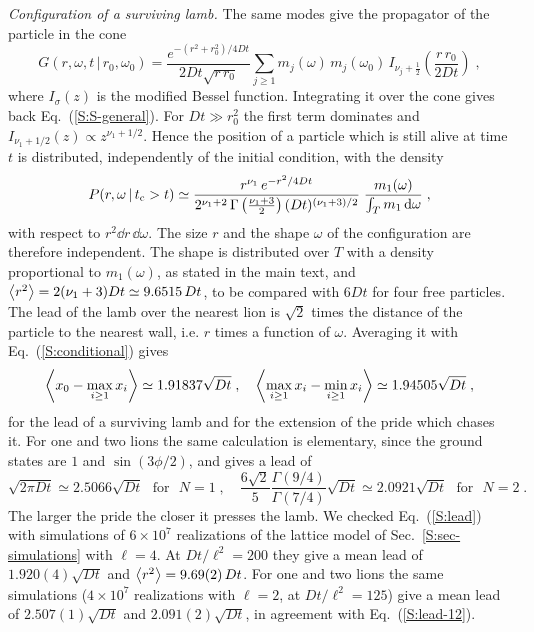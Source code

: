 \emph{Configuration of a surviving lamb.} The same modes give the propagator of the particle in the cone
\begin{equation} \label{S:propagator}
    G(r, \omega, t \,|\, r_0, \omega_0) = \frac{e^{-(r^2 + r_0^2)/4Dt}}{2 D t \sqrt{r \, r_0}} \sum_{j \geq 1} m_j(\omega) \, m_j(\omega_0) \, I_{\nu_j + \frac{1}{2}}\left( \frac{r \, r_0}{2 D t} \right) \;,
\end{equation}
where $I_\sigma(z)$ is the modified Bessel function. Integrating it over the cone gives back Eq.~(\ref{S:S-general}). For $D t \gg r_0^2$ the first term dominates and $I_{\nu_1 + 1/2}(z) \propto z^{\nu_1 + 1/2}$. Hence the position of a particle which is still alive at time $t$ is distributed, independently of the initial condition, with the density
\begin{equation} \label{S:conditional}
    P(r, \omega \,|\, t_{\rm c} > t) \simeq \frac{r^{\nu_1} \, e^{-r^2/4Dt}}{2^{\nu_1 + 2} \, \Gamma\left( \frac{\nu_1 + 3}{2} \right) (D t)^{(\nu_1 + 3)/2}} \; \frac{m_1(\omega)}{\int_T m_1 \, \dd \omega} \;,
\end{equation}
with respect to $r^2 \dd r \, \dd \omega$. The size $r$ and the shape $\omega$ of the configuration are therefore independent. The shape is distributed over $T$ with a density proportional to $m_1(\omega)$, as stated in the main text, and $\left\langle r^2 \right\rangle = 2 (\nu_1 + 3) D t \simeq 9.6515 \, D t$, to be compared with $6 D t$ for four free particles. The lead of the lamb over the nearest lion is $\sqrt{2}$ times the distance of the particle to the nearest wall, i.e. $r$ times a function of $\omega$. Averaging it with Eq.~(\ref{S:conditional}) gives
\begin{equation} \label{S:lead}
    \left\langle x_0 - \max_{i \geq 1} x_i \right\rangle \simeq 1.91837 \sqrt{D t} \;, \quad \left\langle \max_{i \geq 1} x_i - \min_{i \geq 1} x_i \right\rangle \simeq 1.94505 \sqrt{D t} \;,
\end{equation}
for the lead of a surviving lamb and for the extension of the pride which chases it. For one and two lions the same calculation is elementary, since the ground states are $1$ and $\sin(3\phi/2)$, and gives a lead of
\begin{equation} \label{S:lead-12}
    \sqrt{2 \pi D t} \simeq 2.5066 \sqrt{D t} \mbox{~~for~~} N = 1 \;, \quad \frac{6 \sqrt{2}}{5} \frac{\Gamma(9/4)}{\Gamma(7/4)} \sqrt{D t} \simeq 2.0921 \sqrt{D t} \mbox{~~for~~} N = 2 \;.
\end{equation}
The larger the pride the closer it presses the lamb. We checked Eq.~(\ref{S:lead}) with simulations of $6 \times 10^7$ realizations of the lattice model of Sec.~\ref{S:sec-simulations} with $\ell = 4$. At $D t/\ell^2 = 200$ they give a mean lead of $1.920(4) \sqrt{D t}$ and $\left\langle r^2 \right\rangle = 9.69(2) \, D t$. For one and two lions the same simulations ($4 \times 10^7$ realizations with $\ell = 2$, at $D t/\ell^2 = 125$) give a mean lead of $2.507(1) \sqrt{D t}$ and $2.091(2) \sqrt{D t}$, in agreement with Eq.~(\ref{S:lead-12}).


